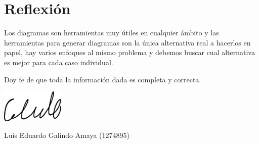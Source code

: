 \documentclass[12pt]{article}
\begin{document}
\section*{Reflexión}
\label{sec:org8e729d1}
\begin{mdframed}
Los diagramas son herramientas muy útiles en cualquier ámbito y las herramientas para generar diagramas son la única alternativa real a hacerlos en papel, hay varios enfoques al mismo problema y debemos buscar cual alternativa es mejor para cada caso individual.
\end{mdframed}

\begin{center}
Doy fe de que toda la información dada es  completa y correcta. \\
\begin{center}
\includegraphics[width=3cm]{../includes/firma.png}
\end{center}
Luis Eduardo Galindo Amaya (1274895)
\end{center}
\end{document}
